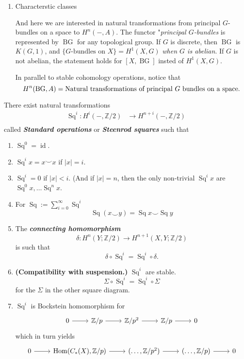 \documentclass{article}
\newcommand{\Z}{\mathbb{Z}}
\begin{document}
\begin{example}
\begin{enumerate}
	\item Characterstic classes
	
	And here we are interested in natural transformations from principal $G$-bundles on a space to $H^{n}(-,A)$.
	The functor "\textit{principal $G$-bundles} is represented by $\operatorname{BG}$ for any topological group. If $G$ is discrete, then $\operatorname{BG}$ is $K(G,1)$, and $\{G\text{-bundles on } X\}=H^{1}(X,G)$ \textit{when $G$ is abelian}. If $G$ is not abelian, the statement holds for $[X,\operatorname{BG}]$ insted of $H^{1}(X,G)$.

In parallel to stable cohomology operations, notice that
\[H^{n}(\operatorname{BG},A)=\text{Natural transformations of principal $ G$ bundles on a space.} \]

\end{enumerate}

\begin{thm}
	There exist natural transformations 
	\begin{align*}
		\operatorname{Sq}^i: H^{i}(-,\Z/2) &\longrightarrow H^{n+i}(-,\Z/2) \\
	\end{align*}
called \textit{\textbf{Standard operations}} or \textit{\textbf{Steenrod squares}} such that
\begin{enumerate}
	\item $\operatorname{Sq}^0=\operatorname{id}$.
	\item $\operatorname{Sq}^ix=x\smile x$ if $|x|=i$.
	\item $\operatorname{Sq}^i=0$ if $|x|<i$. (And if $|x|=n$, then the only non-trivial $\operatorname{Sq}^ix$ are $\operatorname{Sq}^0x,\ldots\operatorname{Sq}^nx$.
	\item For $\operatorname{Sq}:=\sum_{i=0}^\infty\operatorname{Sq}^i$ 
		\[\operatorname{Sq}(x\smile y)=\operatorname{Sq}x\smile \operatorname{Sq}y\]
	\item The \textit{\textbf{connecting homomorphism}}
		\[\delta:H^{n}(Y;\Z/2)\to H^{n+1}(X,Y;\Z/2)\]
		is such that 
		\[\delta\circ \operatorname{Sq}^i=\operatorname{Sq}^i\circ \delta.\]
	\item \textbf{(Compatibility with suspension.)} $\operatorname{Sq}^i$ are stable.
		\[\Sigma\circ \operatorname{Sq}^i=\operatorname{Sq}^i\circ \Sigma\]
		for the $\Sigma$ in the other square diagram.
	 \item $\operatorname{Sq}^i$ is Bockstein homomorphism for
		 \[\begin{tikzcd}
		 	0\arrow[r]&\Z/p\arrow[r]&\Z/p^2\arrow[r]&\Z/p\arrow[r]&0
		 \end{tikzcd}\]
	 which in turn yields
	 \[\begin{tikzcd}
	 	0\arrow[r]&\operatorname{Hom}(C_*(X),\Z/p)\arrow[r]&(\ldots,\Z/p^2)\arrow[r]&(\ldots,\Z/p)\arrow[r]&0
	 \end{tikzcd}\]
	 

\end{enumerate}
\end{thm}
\end{example}
\end{document}
